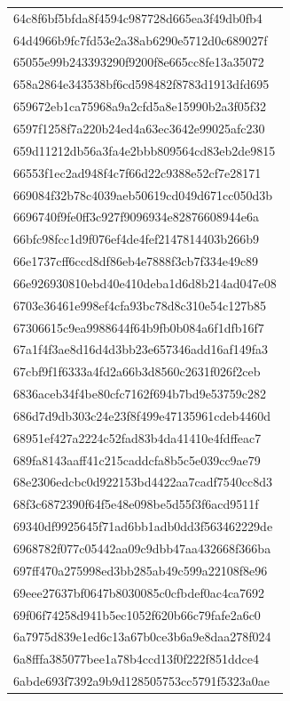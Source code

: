 \begin{tabular}{l}
64c8f6bf5bfda8f4594c987728d665ea3f49db0fb4 \\
64d4966b9fc7fd53e2a38ab6290e5712d0c689027f \\
65055e99b243393290f9200f8e665cc8fe13a35072 \\
658a2864e343538bf6cd598482f8783d1913dfd695 \\
659672eb1ca75968a9a2cfd5a8e15990b2a3f05f32 \\
6597f1258f7a220b24ed4a63ec3642e99025afc230 \\
659d11212db56a3fa4e2bbb809564cd83eb2de9815 \\
66553f1ec2ad948f4c7f66d22c9388e52cf7e28171 \\
669084f32b78c4039aeb50619cd049d671cc050d3b \\
6696740f9fe0ff3c927f9096934e82876608944e6a \\
66bfc98fcc1d9f076ef4de4fef2147814403b266b9 \\
66e1737cff6ccd8df86eb4e7888f3cb7f334e49c89 \\
66e926930810ebd40e410deba1d6d8b214ad047e08 \\
6703e36461e998ef4cfa93bc78d8c310e54c127b85 \\
67306615c9ea9988644f64b9fb0b084a6f1dfb16f7 \\
67a1f4f3ae8d16d4d3bb23e657346add16af149fa3 \\
67cbf9f1f6333a4fd2a66b3d8560c2631f026f2ceb \\
6836aceb34f4be80cfc7162f694b7bd9e53759c282 \\
686d7d9db303c24e23f8f499e47135961cdeb4460d \\
68951ef427a2224c52fad83b4da41410e4fdffeac7 \\
689fa8143aaff41c215caddcfa8b5c5e039cc9ae79 \\
68e2306edcbc0d922153bd4422aa7cadf7540cc8d3 \\
68f3c6872390f64f5e48e098be5d55f3f6acd9511f \\
69340df9925645f71ad6bb1adb0dd3f563462229de \\
6968782f077c05442aa09c9dbb47aa432668f366ba \\
697ff470a275998ed3bb285ab49c599a22108f8e96 \\
69eee27637bf0647b8030085c0cfbdef0ac4ca7692 \\
69f06f74258d941b5ec1052f620b66c79fafe2a6c0 \\
6a7975d839e1ed6c13a67b0ce3b6a9e8daa278f024 \\
6a8fffa385077bee1a78b4ccd13f0f222f851ddce4 \\
6abde693f7392a9b9d128505753cc5791f5323a0ae \\

\end{tabular}
